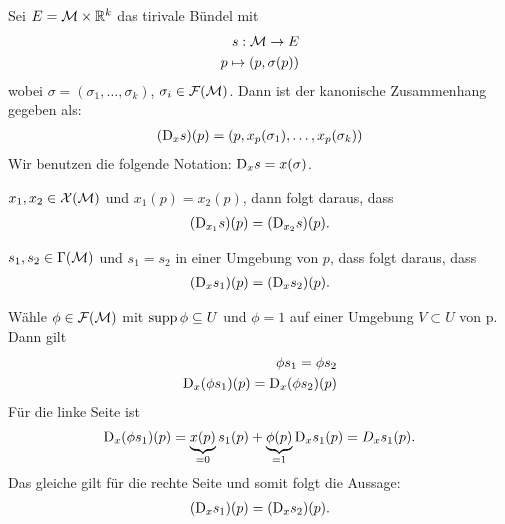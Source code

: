 \begin{bsp}
Sei $E = \mathcal{M} \times \mathbb{R}^k$ das tirivale Bündel mit
\begin{align}
s: \mathcal{M} \to E \\
p \mapsto (p, \sigma(p))
\end{align}
wobei $\sigma = (\sigma_1, \dots, \sigma_k)$, $\sigma_i \in \mathcal{F}(\mathcal{M})$.
Dann ist der kanonische Zusammenhang gegeben als:
\begin{align}
(\mathrm{D}_x s)(p) = (p, x_p(\sigma_1), \dots, x_p(\sigma_k))
\end{align}
Wir benutzen die folgende Notation: $\mathrm{D}_x s = x(\sigma)$.
\end{bsp}

\begin{lem}
\label{lem:lokalisierung1}
$x_1, x_2 \in \mathcal{X}(\mathcal{M})$ und $x_1(p) = x_2(p)$,
dann folgt daraus, dass 
\begin{align}
(\mathrm{D}_{x_1} s)(p) = (\mathrm{D}_{x_2} s) (p).
\end{align}

\end{lem}

\begin{lem}
\label{lem:lokalisierung2}
$s_1, s_2 \in \Gamma(\mathcal{M})$ und $s_1 = s_2$ in einer Umgebung von $p$,
dass folgt daraus, dass
\begin{align}
(\mathrm{D}_{x} s_1)(p) = (\mathrm{D}_{x} s_2) (p).
\end{align}
\end{lem}

\begin{bew}
Wähle $\phi \in \mathcal{F}(\mathcal{M})$ mit $\operatorname{supp} \phi \subseteq U$ und $\phi = 1$ auf einer Umgebung $V \subset U$ von p.
Dann gilt 
\begin{align}
\phi s_1 = \phi s_2 \\
\mathrm{D}_x(\phi s_1)(p) = \mathrm{D}_x(\phi s_2)(p)
\end{align}
Für die linke Seite ist
\begin{align}
\mathrm{D}_x(\phi s_1)(p) = \underbrace{x(p)}_{=0} s_1(p) + \underbrace{\phi(p)}_{=1} \mathrm{D}_x s_1(p) = D_x s_1 (p).
\end{align}
Das gleiche gilt für die rechte Seite und somit folgt die Aussage:
\begin{align}
(\mathrm{D}_{x} s_1)(p) = (\mathrm{D}_{x} s_2) (p).
\end{align}
\end{bew}
